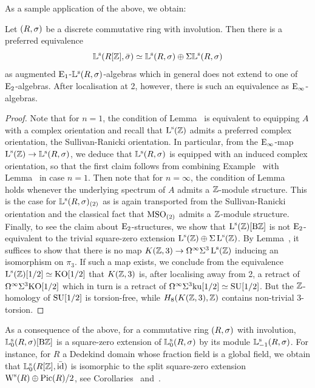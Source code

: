 As a sample application of the above, we obtain:
\begin{corollary}
Let $(R,\sigma)$ be a discrete commutative ring with involution. Then there is a preferred equivalence
\[
\mathbb{L}^{\mathrm{s}}(R[\mathbb{Z}],\bar{\sigma}) \simeq \mathbb{L}^{\mathrm{s}}(R,\sigma) \oplus \Sigma \mathbb{L}^{\mathrm{s}}(R,\sigma)
\]
as augmented ${\mathrm{E}_{1}}$-$\mathbb{L}^{\mathrm{s}}(R,\sigma)$-algebras which in general does not extend to one of ${\mathrm{E}_{2}}$-algebras. After localisation at 2, however, there is such an equivalence as ${\mathrm{E}_{\infty}}$-algebras.
\end{corollary}
\begin{proof}
Note that for $n=1$, the condition of Lemma~ is equivalent to equipping $A$ with a complex orientation and recall that $\operatorname L^{\mathrm{s}}(\mathbb{Z})$ admits a preferred complex orientation, the Sullivan-Ranicki orientation. In particular, from the ${\mathrm{E}_{\infty}}$-map $\operatorname L^{\mathrm{s}}(\mathbb{Z}) \to \mathbb{L}^{\mathrm{s}}(R,\sigma)$, we deduce that $\mathbb{L}^{\mathrm{s}}(R,\sigma)$ is equipped with an induced complex orientation, so that the first claim follows from combining Example~ with Lemma~ in case $n=1$. Then note that for $n=\infty$, the condition of Lemma~ holds whenever the underlying spectrum of $A$ admits a $\mathbb{Z}$-module structure. This is the case for $\mathbb{L}^{\mathrm{s}}(R,\sigma)_{(2)}$ as is again transported from the Sullivan-Ranicki orientation and the classical fact that $\mathrm{MSO}_{(2)}$ admits a $\mathbb{Z}$-module structure. Finally, to see the claim about ${\mathrm{E}_{2}}$-structures, we show that $\operatorname L^{\mathrm{s}}(\mathbb{Z})[\mathrm{B}\mathbb{Z}]$ is not ${\mathrm{E}_{2}}$-equivalent to the trivial square-zero extension $\operatorname L^{\mathrm{s}}(\mathbb{Z}) \oplus \Sigma \operatorname L^{\mathrm{s}}(\mathbb{Z})$. By Lemma~, it suffices to show that there is no map $K(\mathbb{Z},3) \to \Omega^\infty \Sigma^3\operatorname L^{\mathrm{s}}(\mathbb{Z})$ inducing an isomorphism on $\pi_3$. If such a map exists, we conclude from the equivalence $\operatorname L^{\mathrm{s}}(\mathbb{Z})[1/2] \simeq \mathrm{KO}[1/2]$ that $K(\mathbb{Z},3)$ is, after localising away from 2, a retract of $\Omega^\infty \Sigma^3 \mathrm{KO}[1/2]$ which in turn is a retract of $\Omega^\infty \Sigma^3 \mathrm{ku}[1/2] \simeq \mathrm{SU}[1/2]$. But the $\mathbb{Z}$-homology of $\mathrm{SU}[1/2]$ is torsion-free, while $H_8(K(\mathbb{Z},3),\mathbb{Z})$ contains non-trivial $3$-torsion.
\end{proof}

\begin{example}
\label{remark:L-group-sq0}%
As a consequence of the above, for a commutative ring $(R,\sigma)$ with involution, $\mathbb{L}^{\mathrm{s}}_0(R,\sigma)[\mathrm{B}\mathbb{Z}]$ is a square-zero extension of $\mathbb{L}^{\mathrm{s}}_0(R,\sigma)$ by its module $\mathbb{L}_{-1}^{\mathrm{s}}(R,\sigma)$. For instance, for $R$ a Dedekind domain whose fraction field is a global field, we obtain that $\mathbb{L}^{\mathrm{s}}_0(R[\mathbb{Z}],\bar{\mathrm{id}})$ is isomorphic to the split square-zero extension $\operatorname W^{\mathrm{s}}(R) \oplus \operatorname{Pic}(R)/2$, see Corollaries~ and~.
\end{example}


